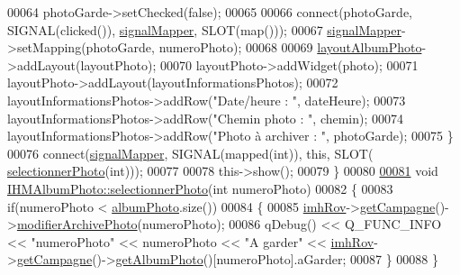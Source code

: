 \begin{DoxyCode}
00064             photoGarde->setChecked(\textcolor{keyword}{false});
00065 
00066         connect(photoGarde, SIGNAL(clicked()), \hyperlink{class_i_h_m_album_photo_a184d7d26edab19328980b55ce727811b}{signalMapper}, SLOT(map()));
00067         \hyperlink{class_i_h_m_album_photo_a184d7d26edab19328980b55ce727811b}{signalMapper}->setMapping(photoGarde, numeroPhoto);
00068 
00069         \hyperlink{class_i_h_m_album_photo_a1b4028248430efc384e34b0151709fa0}{layoutAlbumPhoto}->addLayout(layoutPhoto);
00070         layoutPhoto->addWidget(photo);
00071         layoutPhoto->addLayout(layoutInformationsPhotos);
00072         layoutInformationsPhotos->addRow(\textcolor{stringliteral}{"Date/heure : "}, dateHeure);
00073         layoutInformationsPhotos->addRow(\textcolor{stringliteral}{"Chemin photo : "}, chemin);
00074         layoutInformationsPhotos->addRow(\textcolor{stringliteral}{"Photo à archiver : "}, photoGarde);
00075     \}
00076     connect(\hyperlink{class_i_h_m_album_photo_a184d7d26edab19328980b55ce727811b}{signalMapper}, SIGNAL(mapped(\textcolor{keywordtype}{int})), \textcolor{keyword}{this}, SLOT(
      \hyperlink{class_i_h_m_album_photo_ad0760043151686deea04f8282e6d2210}{selectionnerPhoto}(\textcolor{keywordtype}{int})));
00077 
00078     this->show();
00079 \}
00080 
\hyperlink{class_i_h_m_album_photo_ad0760043151686deea04f8282e6d2210}{00081} \textcolor{keywordtype}{void} \hyperlink{class_i_h_m_album_photo_ad0760043151686deea04f8282e6d2210}{IHMAlbumPhoto::selectionnerPhoto}(\textcolor{keywordtype}{int} numeroPhoto)
00082 \{
00083     \textcolor{keywordflow}{if}(numeroPhoto < \hyperlink{class_i_h_m_album_photo_a686adeccd626a94d9a4996782c851c61}{albumPhoto}.size())
00084     \{
00085         \hyperlink{class_i_h_m_album_photo_ab7056087d5ed3ee1528bd7f689b46c2a}{imhRov}->\hyperlink{class_i_h_m_rov_ab3e8686eef9233b4c1e6711cf1c4576a}{getCampagne}()->\hyperlink{class_campagne_a7751a5a0b5d1be46384f57b5409163e8}{modifierArchivePhoto}(numeroPhoto);
00086         qDebug() << Q\_FUNC\_INFO << \textcolor{stringliteral}{"numeroPhoto"} << numeroPhoto << \textcolor{stringliteral}{"A garder"} << 
      \hyperlink{class_i_h_m_album_photo_ab7056087d5ed3ee1528bd7f689b46c2a}{imhRov}->\hyperlink{class_i_h_m_rov_ab3e8686eef9233b4c1e6711cf1c4576a}{getCampagne}()->\hyperlink{class_campagne_abec90fcbc0c4ded45caaac9adb454add}{getAlbumPhoto}()[numeroPhoto].aGarder;
00087     \}
00088 \}
\end{DoxyCode}
